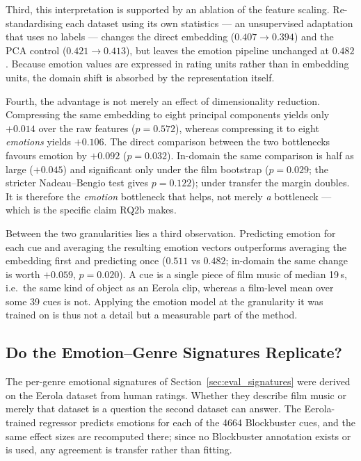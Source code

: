 Third, this interpretation is supported by an ablation of the feature scaling.
Re-standardising each dataset using its own statistics --- an unsupervised adaptation that
uses no labels --- changes the direct embedding ($0.407 \rightarrow 0.394$) and the PCA
control ($0.421 \rightarrow 0.413$), but leaves the emotion pipeline unchanged at
$0.482$. Because emotion values are expressed in rating units rather than in embedding
units, the domain shift is absorbed by the representation itself.

Fourth, the advantage is not merely an effect of dimensionality reduction. Compressing the
same embedding to eight principal components yields only $+0.014$ over the raw features
($p = 0.572$), whereas compressing it to eight \emph{emotions} yields $+0.106$. The direct
comparison between the two bottlenecks favours emotion by $+0.092$
($p = 0.032$). In-domain the same comparison is half as large ($+0.045$) and significant only under
the film bootstrap ($p = 0.029$; the stricter Nadeau--Bengio test gives $p = 0.122$);
under transfer the margin doubles. It is therefore the \emph{emotion} bottleneck that helps, not
merely \emph{a} bottleneck --- which is the specific claim RQ2b makes.

Between the two granularities lies a third observation. Predicting emotion for each cue
and averaging the resulting emotion vectors outperforms averaging the embedding first and
predicting once ($0.511$ vs $0.482$; in-domain the same change is worth $+0.059$,
$p = 0.020$). A cue is a single piece of film music of median 19\,s, i.e.\ the same kind of
object as an Eerola clip, whereas a film-level mean over some 39 cues is not. Applying
the emotion model at the granularity it was trained on is thus not a detail but a
measurable part of the method.

\subsection{Do the Emotion--Genre Signatures Replicate?}
\label{subsec:signature_replication}

The per-genre emotional signatures of Section~\ref{sec:eval_signatures} were derived on
the Eerola dataset from human ratings. Whether they describe film music or merely that
dataset is a question the second dataset can answer. The Eerola-trained regressor predicts
emotions for each of the 4664 Blockbuster cues, and the same effect sizes are recomputed
there; since no Blockbuster annotation exists or is used, any agreement is transfer rather
than fitting.

